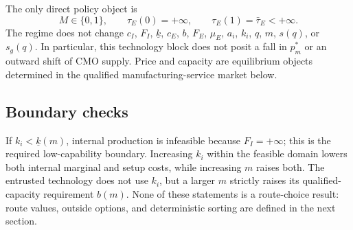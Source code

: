 The only direct policy object is
\begin{equation}
  M\in\{0,1\},
  \qquad
  \tau_E(0)=+\infty,
  \qquad
  \tau_E(1)=\bar\tau_E<+\infty.
  \label{eq:p03-policy-invariance}
\end{equation}
The regime does not change \(c_I\), \(F_I\), \(\underline{k}\), \(c_E\),
\(b\), \(F_E\), \(\mu_E\), \(a_i\), \(k_i\), \(q\), \(m\), \(s(q)\), or
\(s_g(q)\). In particular, this technology block does not posit a fall in
\(p_m^*\) or an outward shift of CMO supply. Price and capacity are equilibrium
objects determined in the qualified manufacturing-service market below.

\subsection{Boundary checks}
\label{subsec:p03-boundaries}

If \(k_i<\underline{k}(m)\), internal production is infeasible because
\(F_I=+\infty\); this is the required low-capability boundary. Increasing
\(k_i\) within the feasible domain lowers both internal marginal and setup
costs, while increasing \(m\) raises both. The entrusted technology does not
use \(k_i\), but a larger \(m\) strictly raises its qualified-capacity
requirement \(b(m)\). None of these statements is a route-choice result:
route values, outside options, and deterministic sorting are defined in the
next section.
